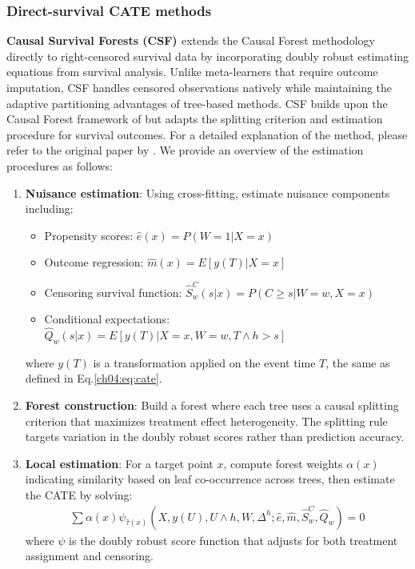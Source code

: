 \subsubsection{Direct-survival CATE methods}
\textbf{Causal Survival Forests (CSF) \citep{ch04:cui2023estimating}} extends the Causal Forest methodology directly to right-censored survival data by incorporating doubly robust estimating equations from survival analysis. Unlike meta-learners that require outcome imputation, CSF handles censored observations natively while maintaining the adaptive partitioning advantages of tree-based methods.
CSF builds upon the Causal Forest framework of \citet{athey2019grf} but adapts the splitting criterion and estimation procedure for survival outcomes.
For a detailed explanation of the method, please refer to the original paper by \citet{ch04:cui2023estimating}.
We provide an overview of the estimation procedures as follows:
\begin{enumerate}
    \item \textbf{Nuisance estimation}: Using cross-fitting, estimate nuisance components including:
        \begin{itemize}
            \item Propensity scores: $\hat{e}(x) = P(W = 1|X = x)$
            \item Outcome regression: $\hat{m}(x) = E[y(T)|X = x]$ 
            \item Censoring survival function: $\hat{S}^C_w(s|x) = P(C \geq s|W = w, X = x)$
            \item Conditional expectations: $\hat{Q}_w(s|x) = E[y(T)|X = x, W = w, T \wedge h > s]$
        \end{itemize}
        where $y(T)$ is a transformation applied on the event time $T$, the same as defined in Eq.\ref{ch04:eq:cate}.
    \item \textbf{Forest construction}: Build a forest where each tree uses a causal splitting criterion that maximizes treatment effect heterogeneity.
The splitting rule targets variation in the doubly robust scores rather than prediction accuracy.
    \item \textbf{Local estimation}: For a target point $x$, compute forest weights $\alpha(x)$ indicating similarity based on leaf co-occurrence across trees, then estimate the CATE by solving:
        \begin{align*}
            \sum \alpha(x) \psi_{\hat{\tau}(x)}(X, y(U), U \wedge h, W, \Delta^h; \hat{e}, \hat{m}, \hat{S}^C_w, \hat{Q}_w) = 0
        \end{align*}
        where $\psi$ is the doubly robust score function that adjusts for both treatment assignment and censoring.
\end{enumerate}


